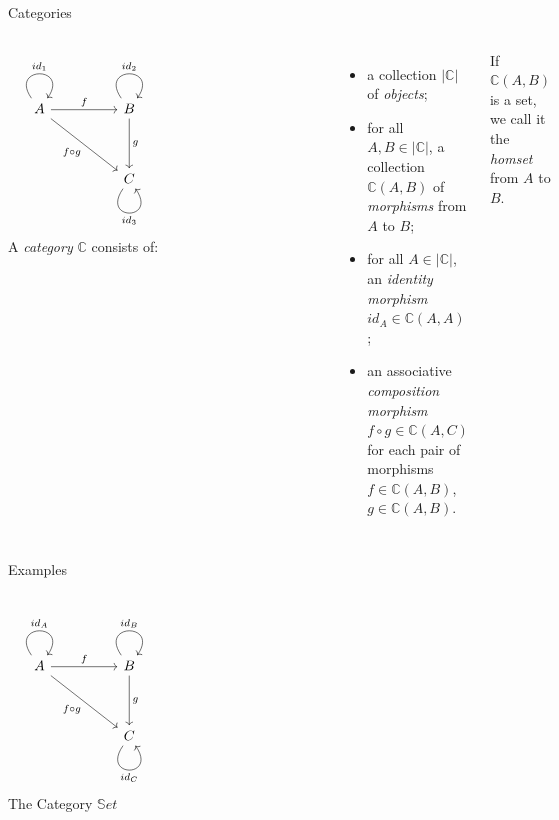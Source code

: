 \documentclass[aspectratio=169]{beamer} %
\newcommand{\bC}{\mathbb{C}}
\begin{document}
{\begin{frame}[fragile]{Categories}
\begin{columns}
\[\begin{tikzcd}
	A && B \\
	\\
	&& C &&&&& {}
	\arrow["{id_1}", from=1-1, to=1-1, loop, in=55, out=125, distance=10mm]
	\arrow["f", from=1-1, to=1-3]
	\arrow["{f \circ g}"', from=1-1, to=3-3]
	\arrow["{id_2}", from=1-3, to=1-3, loop, in=55, out=125, distance=10mm]
	\arrow["g", from=1-3, to=3-3]
	\arrow["{id_3}"', from=3-3, to=3-3, loop, in=305, out=235, distance=10mm]
\end{tikzcd}\]
A \textit{category} $\bC$ consists of:
\begin{itemize}
 \pause\item a collection $|\bC|$ of \textit{objects};
 \pause\item for all $A, B \in |\bC|$, a collection $\bC(A, B)$ of \textit{morphisms} from $A$ to $B$;
 \pause\item for all $A \in |\bC|$, an \textit{identity morphism} $id_A \in \bC(A, A)$;
 \pause\item an associative \textit{composition morphism} $f \circ g \in \bC(A,C)$ for each pair of morphisms $f \in \bC(A,B)$, $g \in \bC(A,B)$.
\end{itemize}
If $\bC(A, B)$ is a set, we call it the \textit{homset} from $A$ to $B$.
\end{columns}
\end{frame}
\iffalse
\begin{frame}[fragile]{Examples}
\begin{columns}
\[\begin{tikzcd}
	A && B \\
	\\
	&& C &&&&& {}
	\arrow["{id_A}", from=1-1, to=1-1, loop, in=55, out=125, distance=10mm]
	\arrow["{f}", from=1-1, to=1-3]
	\arrow["{f \circ g}"', from=1-1, to=3-3]
	\arrow["{id_B}", from=1-3, to=1-3, loop, in=55, out=125, distance=10mm]
	\arrow["{g}", from=1-3, to=3-3]
	\arrow["{id_C}"', from=3-3, to=3-3, loop, in=305, out=235, distance=10mm]
\end{tikzcd}\]
The Category $\mathbb{S}et$
\begin{itemize}

\end{itemize}
\end{columns}
\end{frame}}
\end{document}
